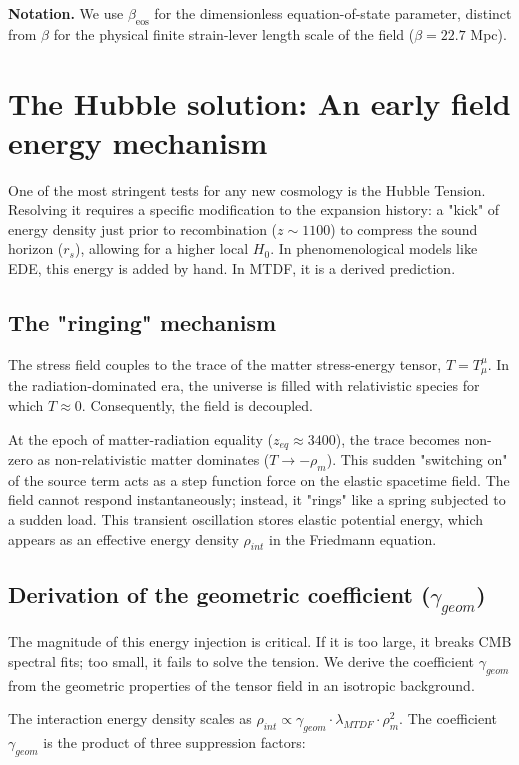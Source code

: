 \documentclass[11pt,a4paper]{article}
\begin{document}
\textbf{Notation.} We use $\beta_\text{eos}$ for the dimensionless equation-of-state parameter, distinct from $\beta$ for the physical finite strain-lever length scale of the field ($\beta = 22.7$ Mpc).

\section{The Hubble solution: An early field energy mechanism}
\label{sec:sec5}
One of the most stringent tests for any new cosmology is the Hubble Tension. Resolving it requires a specific modification to the expansion history: a "kick" of energy density just prior to recombination ($z \sim 1100$) to compress the sound horizon ($r_s$), allowing for a higher local $H_0$. In phenomenological models like EDE, this energy is added by hand. In MTDF, it is a derived prediction.

\subsection{The "ringing" mechanism}
The stress field couples to the trace of the matter stress-energy tensor, $T = T^\mu_\mu$. In the radiation-dominated era, the universe is filled with relativistic species for which $T \approx 0$. Consequently, the field is decoupled.

At the epoch of matter-radiation equality ($z_{eq} \approx 3400$), the trace becomes non-zero as non-relativistic matter dominates ($T \to -\rho_m$). This sudden "switching on" of the source term acts as a step function force on the elastic spacetime field. The field cannot respond instantaneously; instead, it "rings" like a spring subjected to a sudden load. This transient oscillation stores elastic potential energy, which appears as an effective energy density $\rho_{int}$ in the Friedmann equation.

\subsection{Derivation of the geometric coefficient ($\gamma_{geom}$)}
The magnitude of this energy injection is critical. If it is too large, it breaks CMB spectral fits; too small, it fails to solve the tension. We derive the coefficient $\gamma_{geom}$ from the geometric properties of the tensor field in an isotropic background.

The interaction energy density scales as $\rho_{int} \propto \gamma_{geom} \cdot \lambda_{MTDF} \cdot \rho_m^2$. The coefficient $\gamma_{geom}$ is the product of three suppression factors:
\end{document}
